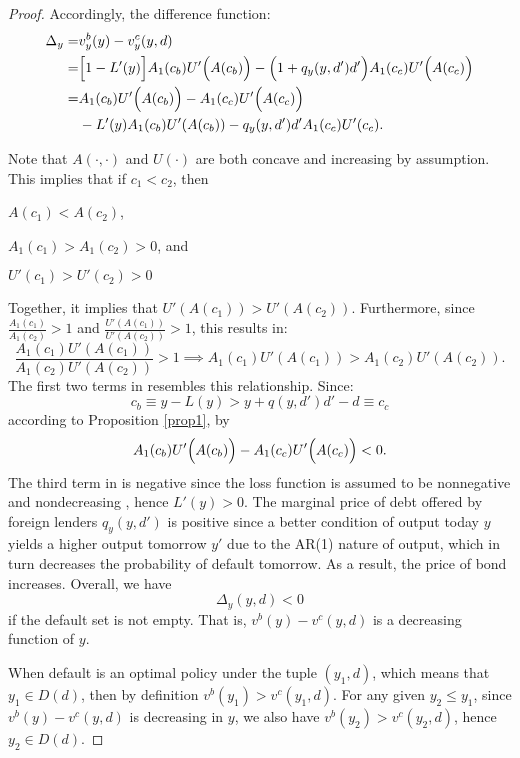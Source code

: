 \begin{proof}
    Accordingly, the difference function:
    \begin{align}
        \Delta_y =& v^b_y(y) - v^c_y(y, d) \nonumber \\
        =& \Big[ 1 - L' (y)\Big] A_1 (c_b) U' \Bigl(A(c_b)\Bigr)-
            \Big(1 + q_y(y, d')d'\Big) A_1(c_c) U'\Big(A(c_c)\Big) \nonumber\\
        =& A_1 (c_b) U' \Bigl(A(c_b)\Bigr)-A_1 (c_c) U' \Bigl(A(c_c)\Bigr)  \nonumber \\
        & -L'(y) A_1(c_b)U'(A(c_b)) - q_y(y, d')d'A_1(c_c)U'(c_c). \label{eq:diff-value-function}
    \end{align}

    Note that $A(\cdot, \cdot)$ and $U(\cdot)$ are both concave and increasing by assumption. This implies that if $c_1<c_2$, then
    \begin{enumerate*}[label = (\roman*)]
        \item $A(c_1) < A(c_2)$,
        \item $A_1(c_1) > A_1(c_2)>0$, and
        \item $U'(c_1) > U'(c_2)>0$
    \end{enumerate*}
    Together, it implies that $U'(A(c_1)) > U'(A(c_2))$. Furthermore, since $\frac{A_1(c_1)}{A_1(c_2)} > 1$ and $\frac {U'(A(c_1))}{U'(A(c_2))} > 1$, this results in:
    \begin{equation}
        \label{eq:AUA-compare}
        \frac{A_1(c_1) U'(A(c_1))}{A_1(c_2) U'(A(c_2))} > 1 \implies
        {A_1(c_1) U'(A(c_1))} > {A_1(c_2) U'(A(c_2))}.
    \end{equation}
    The first two terms in  resembles this relationship. Since:
    \begin{equation*}
        c_b \equiv y - L(y) > y+q(y, d')d' -d \equiv c_c
    \end{equation*}
    according to Proposition \ref{prop1}, by 
    \begin{equation*}
        A_1 (c_b) U' \Bigl(A(c_b)\Bigr) - A_1 (c_c) U' \Bigl(A(c_c)\Bigr) < 0.
    \end{equation*}
    The third term in  is negative since the loss function is assumed to be nonnegative and nondecreasing \citep{Na-18}, hence $L'(y) > 0$. The marginal price of debt offered by foreign lenders $q_y(y, d')$ is positive since a better condition of output today $y$ yields a higher output tomorrow $y'$ due to the AR(1) nature of output, which in turn decreases the probability of default tomorrow. As a result, the price of bond increases.
    Overall, we have
    \begin{equation*}
        \Delta_y (y, d) < 0
    \end{equation*}
    if the default set is not empty. That is, $v^b(y) - v^c(y, d)$ is a decreasing function of $y$.

    When default is an optimal policy under the tuple $(y_1, d)$, which means that $y_1 \in D(d)$, then by definition $v^b(y_1) > v^c(y_1, d)$. For any given $y_2 \le y_1$, since $v^b(y) - v^c(y, d)$ is decreasing in $y$, we also have $v^b(y_2) > v^c(y_2, d)$, hence $y_2 \in D(d)$.
\end{proof}


